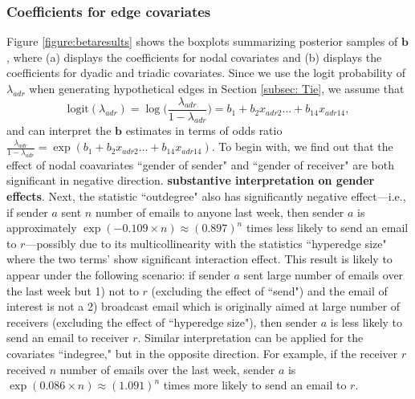 \documentclass[ba]{imsart}
\numberwithin{equation}{section}
\theoremstyle{plain}
\begin{document}
	\subsubsection{Coefficients for edge covariates}
	Figure \ref{figure:betaresults} shows the boxplots summarizing posterior samples of $\boldsymbol{b}$, where (a) displays the coefficients for nodal covariates and (b) displays the coefficients for dyadic and triadic covariates. Since we use the logit probability of $\lambda_{adr}$ when generating hypothetical edges in Section \ref{subsec: Tie}, we assume that 
	\begin{equation*}
	\mbox{logit}(\lambda_{adr})=\log\Big(\frac{\lambda_{adr}}{1-\lambda_{adr}}\Big) =b_{1}+b_{2} x_{adr2}\ldots+b_{14}x_{adr14},
	\end{equation*}
	and can interpret the $\boldsymbol{b}$ estimates in terms of odds ratio $\frac{\lambda_{adr}}{1-\lambda_{adr}}=\exp(b_{1}+b_{2} x_{adr2}\ldots+b_{14}x_{adr14})$.
	To begin with, we find out that the effect of nodal coavariates ``gender of sender" and ``gender of receiver" are both significant in negative direction. \textbf{substantive interpretation on gender effects}. Next, the statistic ``outdegree" also has significantly negative effect---i.e., if sender $a$ sent $n$ number of emails to anyone last week, then sender $a$ is approximately $\exp(-0.109\times n)\approx(0.897)^n$ times less likely to send an email to $r$---possibly due to its multicollinearity with the statistics ``hyperedge size" where the two terms' show significant interaction effect. This result is likely to appear under the following scenario: if sender $a$ sent large number of emails over the last week but 1) not to $r$ (excluding the effect of ``send") and the email of interest is not a  2) broadcast email which is originally aimed at large number of receivers (excluding the effect of ``hyperedge size"), then sender $a$ is less likely to send an email to receiver $r$. Similar interpretation can be applied for the covariates ``indegree," but in the opposite direction. For example, if the receiver $r$ received $n$ number of emails over the last week, sender $a$ is $\exp(0.086\times n)\approx(1.091)^n $ times more likely to send an email to $r$. 
	
\end{document}
